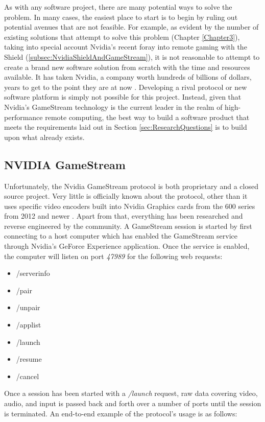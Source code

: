 As with any software project, there are many potential ways to solve the problem.
In many cases, the easiest place to start is to begin by ruling out potential avenues that are not feasible.
For example, as evident by the number of existing solutions that attempt to solve this problem (Chapter \ref{Chapter3}), taking into special account Nvidia's recent foray into remote gaming with the Shield (\ref{subsec:NvidiaShieldAndGameStream}), it is not reasonable to attempt to create a brand new software solution from scratch with the time and resources available.
It has taken Nvidia, a company worth hundreds of billions of dollars, years to get to the point they are at now \cite{brown_2013}.
Developing a rival protocol or new software platform is simply not possible for this project.
Instead, given that Nvidia's GameStream technology is the current leader in the realm of high-performance remote computing, the best way to build a software product that meets the requirements laid out in Section \ref{sec:ResearchQuestions} is to build upon what already exists.


\subsection{NVIDIA GameStream}\label{subsec:NVIDIAGameStream}


Unfortunately, the Nvidia GameStream protocol is both proprietary and a closed source project.
Very little is officially known about the protocol, other than it uses specific video encoders built into Nvidia Graphics cards from the 600 series from 2012 and newer \cite{gamestream_userguide}.
Apart from that, everything has been researched and reverse engineered by the community.
A GameStream session is started by first connecting to a host computer which has enabled the GameStream service through Nvidia's GeForce Experience application.
Once the service is enabled, the computer will listen on port \emph{47989} for the following web requests:
\begin{itemize}
  \item /serverinfo
  \item /pair
  \item /unpair
  \item /applist
  \item /launch
  \item /resume
  \item /cancel
\end{itemize}
Once a session has been started with a \emph{/launch} request, raw data covering video, audio, and input is passed back and forth over a number of ports until the session is terminated.
An end-to-end example of the protocol's usage is as follows:

